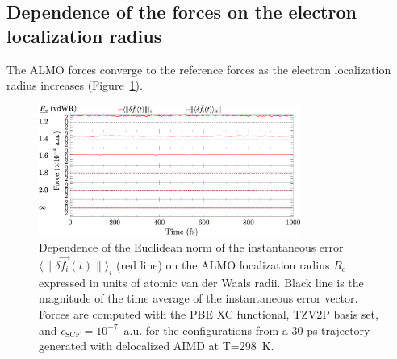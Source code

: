 \documentclass[aps,prl,reprint,amsmath,amssymb]{revtex4-1}
\begin{document}
\subsection{Dependence of the forces on the electron localization radius}

The ALMO forces converge to the reference forces as the electron localization radius increases (Figure~\ref{fig:forcecomp}).

\begin{figure}[h!]
\includegraphics[trim={0cm 0cm 0.1cm 0.1cm},clip,width=8.6cm]{DeltaForceComparison_ALMO_SCF.eps}
\caption{\label{fig:forcecomp} Dependence of the Euclidean norm of the instantaneous error $\langle \| \delta \vec{f_{i}}(t) \| \rangle_{i}$ (red line) on the ALMO localization radius $R_c$ expressed in units of atomic van der Waals radii. Black line is the magnitude of the time average of the instantaneous error vector. %
Forces are computed with the PBE XC functional, TZV2P basis set, and $\epsilon_{\text{SCF}} = 10^{-7}$~a.u. for the configurations from a 30-ps trajectory generated with delocalized AIMD at T=298~K.}
\end{figure}



\fi %
\end{document}
